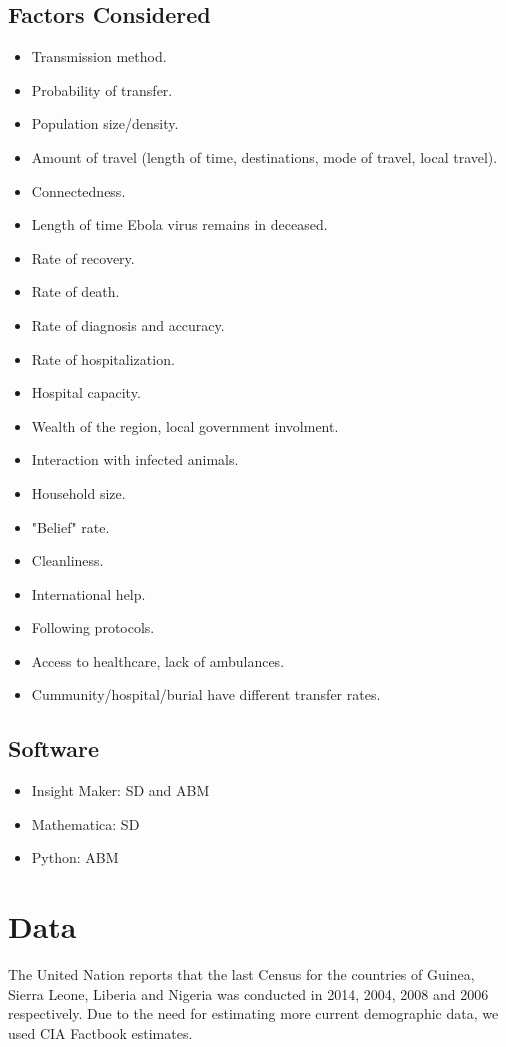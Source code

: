 \documentclass[10pt]{article}
\begin{document}
\subsection{Factors Considered}
\begin{itemize}
\item Transmission method.
\item Probability of transfer.
\item Population size/density.
\item Amount of travel (length of time, destinations, mode of travel, local travel).
\item Connectedness.
\item Length of time Ebola virus remains in deceased.
\item Rate of recovery.
\item Rate of death.
\item Rate of diagnosis and accuracy.
\item Rate of hospitalization.
\item Hospital capacity.
\item Wealth of the region, local government involment.
\item Interaction with infected animals.
\item Household size.
\item "Belief" rate.
\item Cleanliness.
\item International help.
\item Following protocols.
\item Access to healthcare, lack of ambulances.
\item Cummunity/hospital/burial have different transfer rates.
\end{itemize}

\subsection{Software}
\begin{itemize}
\item Insight Maker: SD and ABM
\item Mathematica: SD
\item Python: ABM

\end{itemize}

%
%
%
%
%
%
%
%
%
\section{Data}\label{sec:Data}
The United Nation reports that the last Census for the countries of Guinea, Sierra Leone, Liberia and Nigeria  was conducted in 2014, 2004, 2008 and 2006 respectively. Due to the need for estimating more current demographic data, we used CIA Factbook estimates. 
\end{document}
